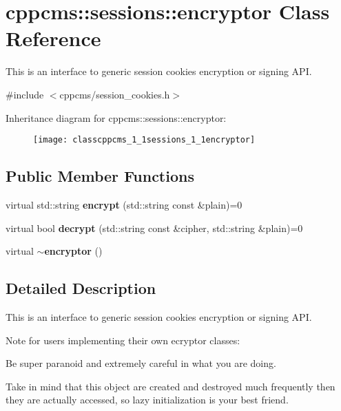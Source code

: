 \section{cppcms\-:\-:sessions\-:\-:encryptor \-Class \-Reference}
\label{classcppcms_1_1sessions_1_1encryptor}


\-This is an interface to generic session cookies encryption or signing \-A\-P\-I.  




{\ttfamily \#include $<$cppcms/session\-\_\-cookies.\-h$>$}

\-Inheritance diagram for cppcms\-:\-:sessions\-:\-:encryptor\-:\begin{figure}[H]
\begin{center}
\leavevmode
\texttt{[image: classcppcms\_1\_1sessions\_1\_1encryptor]}
\end{center}
\end{figure}
\subsection*{\-Public \-Member \-Functions}
\begin{DoxyCompactItemize}
\item 
virtual std\-::string {\bf encrypt} (std\-::string const \&plain)=0
\item 
virtual bool {\bf decrypt} (std\-::string const \&cipher, std\-::string \&plain)=0
\item 
virtual {\bf $\sim$encryptor} ()
\end{DoxyCompactItemize}


\subsection{\-Detailed \-Description}
\-This is an interface to generic session cookies encryption or signing \-A\-P\-I. 

\-Note for users implementing their own ecryptor classes\-:


\begin{DoxyItemize}
\item \-Be super paranoid and extremely careful in what you are doing.
\item \-Take in mind that this object are created and destroyed much frequently then they are actually accessed, so lazy initialization is your best friend.
\end{DoxyItemize}

